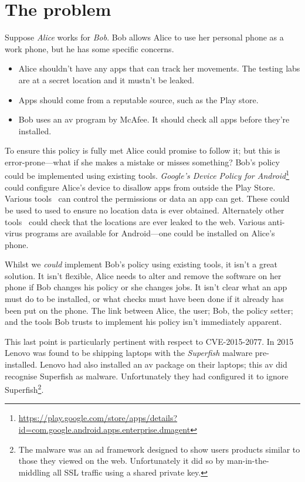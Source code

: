 \documentclass[a4paper]{scrartcl}
\newcommand{\comment}[1]{}%
\begin{document}
\section{The problem\comment{1 page}}
\label{sec:problem}

Suppose \emph{Alice} works for \emph{Bob}.
Bob allows Alice to use her personal phone as a work phone, but he has some specific concerns.
\begin{itemize}
  \item Alice shouldn't have any apps that can track her movements.
    The testing labs are at a secret location and it mustn't be leaked.
  \item Apps should come from a reputable source, such as the Play store.
  \item Bob uses an \ac{av} program by McAfee. 
    It should check all apps before they're installed.
\end{itemize}

To ensure this policy is fully met Alice could promise to follow it; but this is error-prone---what if she makes a mistake or misses something?
Bob's policy could be implemented using existing tools.
\emph{Google's Device Policy for Android}\footnote{\url{https://play.google.com/store/apps/details?id=com.google.android.apps.enterprise.dmagent}}
  could configure Alice's device to disallow apps from outside the Play Store.
Various tools~\citep{Backes:2012vm,Jeon:2012ki,Hornyack:2011wq} can control the permissions or data an app can get.
These could be used to used to ensure no location data is ever obtained.
Alternately other tools~\citep{Enck:2009ko,Fritz:2013vi,Gordon:2015et} could check that the locations are ever leaked to the web.
Various anti-virus programs are available for Android---one could be installed on Alice's phone.

Whilst we \emph{could} implement Bob's policy using existing tools, it isn't a great solution.
It isn't flexible, Alice needs to alter and remove the software on her phone if Bob changes his policy or she changes jobs.
It isn't clear what an app must do to be installed, or what checks must have been done if it already has been put on the phone.
The link between Alice, the user; Bob, the policy setter; and the tools Bob trusts to implement his policy isn't immediately apparent.

This last point is particularly pertinent with respect to \textsc{CVE-2015-2077}.
In 2015 Lenovo was found to be shipping laptops with the \emph{Superfish} malware pre-installed.
Lenovo had also installed an \ac{av} package on their laptops; this \ac{av} did recognise Superfish as malware.
Unfortunately they had configured it to ignore Superfish\footnote{The malware was an ad framework designed to show users products similar to those they viewed on the web.  Unfortunately it did so by man-in-the-middling all SSL traffic using a shared private key.}.
\end{document}
